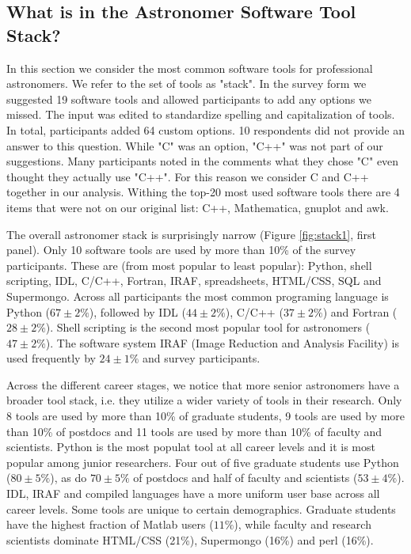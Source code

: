 
\subsection{What is in the Astronomer Software Tool Stack?}

In this section we consider the most common software tools for professional astronomers. We refer to the set of tools as "stack". In the survey form we suggested 19 software tools and allowed participants to add any options we missed. The input was edited to standardize spelling and capitalization of tools. In total, participants added 64 custom options. 10 respondents did not provide an answer to this question. While "C" was an option, "C++" was not part of our suggestions. Many participants noted in the comments what they chose "C" even thought they actually use "C++". For this reason we consider C and C++ together in our analysis. Withing the top-20 most used software tools there are 4 items that were not on our original list: C++, Mathematica, gnuplot and awk.

The overall astronomer stack is surprisingly narrow (Figure \ref{fig:stack1}, first panel). Only 10 software tools are used by more than 10\% of the survey participants. These are (from most popular to least popular): Python, shell scripting, IDL, C/C++, Fortran, IRAF, spreadsheets, HTML/CSS, SQL and Supermongo. Across all participants the most common programing language is Python ($67\pm2\%$), followed by IDL ($44\pm2\%$), C/C++ ($37\pm2\%$) and Fortran ($28\pm2\%$). Shell scripting is the second most popular tool for astronomers ($47\pm2\%$). The software system IRAF (Image Reduction and Analysis Facility) is used frequently by $24\pm1\%$ and survey participants. 

Across the different career stages, we notice that more senior astronomers have a broader tool stack, i.e. they utilize a wider variety of tools in their research. Only 8 tools are used by more than 10\% of graduate students, 9 tools are used by more than 10\% of postdocs and 11 tools are used by more than 10\% of faculty and scientists. Python is the most populat tool at all career levels and it is most popular among junior researchers. Four out of five graduate students use Python ($80\pm5\%$), as do $70\pm5\%$ of postdocs and half of faculty and scientists ($53\pm4\%$). IDL, IRAF and compiled languages have a more uniform user base across all career levels. Some tools are unique to certain demographics. Graduate students have the highest fraction of Matlab users ($11\%$), while faculty and research scientists dominate HTML/CSS (21\%), Supermongo (16\%) and perl (16\%).

